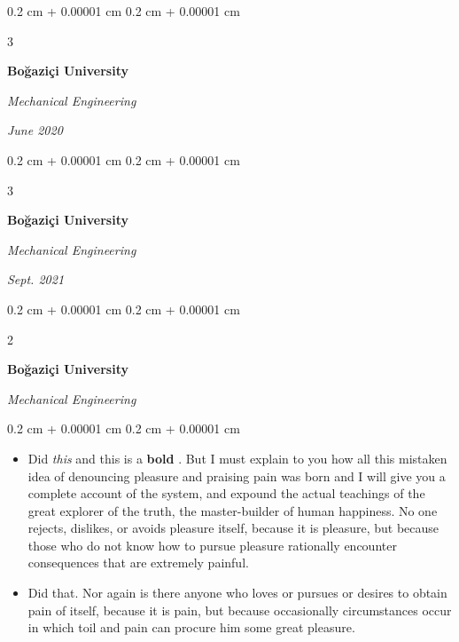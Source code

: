 \documentclass[10pt, letterpaper]{article}
\newenvironment{highlights}{
    \begin{itemize}[
        topsep=0.10 cm,
        parsep=0.10 cm,
        partopsep=0pt,
        itemsep=0pt,
        leftmargin=0.4 cm + 10pt + 0.6 cm
    ]
}{
    \end{itemize}
} %
\newenvironment{onecolentry}{
    \begin{adjustwidth}{
        0.2 cm + 0.00001 cm
    }{
        0.2 cm + 0.00001 cm
    }
}{
    \end{adjustwidth}
} %
\newenvironment{onecolentrybulleted}{
    \onecolentry
    \setcolumnwidth{0.6 cm, \fill}
    \begin{paracol}{2}
    \vspace*{\fill}
    \textbullet
    \vspace*{3px}
    \vspace*{\fill}
    \switchcolumn
}{
    \end{paracol}
    \endonecolentry
} %
\newenvironment{threecolentry}[3][]{
    \onecolentry
    \def\thirdColumn{#3}
    \setcolumnwidth{0.6 cm, \fill, 4.5 cm}
    \begin{paracol}{3}
    #2 \switchcolumn
}{
    \switchcolumn \raggedleft \thirdColumn
    \end{paracol}
    \endonecolentry
} %
\let\hrefWithoutArrow\href
\renewcommand{\href}[2]{\hrefWithoutArrow{#1}{\mbox{\ifthenelse{\equal{#2}{}}{ }{#2 }\raisebox{.15ex}{\footnotesize \faExternalLink*}}}}
\begin{document}
        \vspace{0.2 cm-3px}

        \begin{threecolentry}{
            \vspace*{\fill}
            \textbullet
            \vspace*{3px}
            \vspace*{\fill}
        }{
            
            
        \textit{June 2020}}
            \textbf{Boğaziçi University}

            \textit{Mechanical Engineering}
        \end{threecolentry}



        \vspace{0.2 cm-3px}

        \begin{threecolentry}{
            \vspace*{\fill}
            \textbullet
            \vspace*{3px}
            \vspace*{\fill}
        }{
            
            
        \textit{Sept. 2021}}
            \textbf{Boğaziçi University}

            \textit{Mechanical Engineering}
        \end{threecolentry}



        \vspace{0.2 cm-3px}

        \begin{onecolentrybulleted}
            \textbf{Boğaziçi University}

            \textit{Mechanical Engineering}
        \end{onecolentrybulleted}

        \vspace{0.10 cm-3px}
        \begin{onecolentry}
            \begin{highlights}
                \item Did \textit{this} and this is a \textbf{bold} \href{https://example.com}{link}. But I must explain to you how all this mistaken idea of denouncing pleasure and praising pain was born and I will give you a complete account of the system, and expound the actual teachings of the great explorer of the truth, the master-builder of human happiness. No one rejects, dislikes, or avoids pleasure itself, because it is pleasure, but because those who do not know how to pursue pleasure rationally encounter consequences that are extremely painful.
                \item Did that. Nor again is there anyone who loves or pursues or desires to obtain pain of itself, because it is pain, but because occasionally circumstances occur in which toil and pain can procure him some great pleasure.
            \end{highlights}
        \end{onecolentry}
\end{document}

